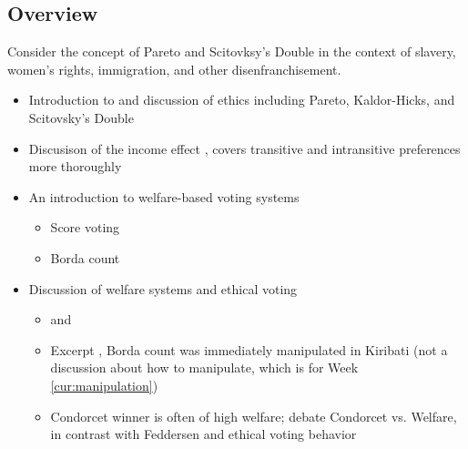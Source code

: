 \subsection{Overview}

\begin{todo}
    Consider the concept of Pareto and Scitovksy's Double in the context of slavery, women's rights, immigration, and other disenfranchisement.
\end{todo}

\begin{itemize}
    \item Introduction to and discussion of ethics including Pareto, Kaldor-Hicks, and Scitovsky's Double \autocite[24-30]{Tideman2006}

    \item Discusison of the income effect \autocite[30-31]{Tideman2006}, covers transitive and intransitive preferences more thoroughly

    \item An introduction to welfare-based voting systems
    \begin{itemize}
        \item Score voting

        \item Borda count
    \end{itemize}

    \item Discussion of welfare systems and ethical voting
    \begin{itemize}
        \item \autocite{Baujard2014} and \autocite{Feddersen2009}

        \item Excerpt \autocite{Reilly2002}, Borda count was immediately manipulated in Kiribati (not a discussion about how to manipulate, which is for Week \ref{cur:manipulation})

        \item Condorcet winner is often of high welfare; debate Condorcet vs. Welfare, in contrast with Feddersen and ethical voting behavior \autocite{Tideman2019}
    \end{itemize}
\end{itemize}

